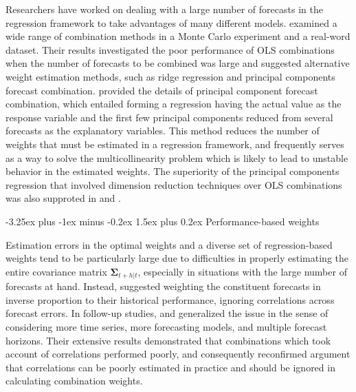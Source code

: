 \documentclass[11pt]{article}
\makeatletter
\renewcommand{\paragraph}{\@startsection{paragraph}{4}{0ex}%
   {-3.25ex plus -1ex minus -0.2ex}%
   {1.5ex plus 0.2ex}%
   {\normalfont\normalsize\bfseries}}
\makeatother
\begin{document}
Researchers have worked on dealing with a large number of forecasts in the regression framework to take advantages of many different models. \cite{Chan1999-io} examined a wide range of combination methods in a Monte Carlo experiment and a real-word dataset. Their results investigated the poor performance of OLS combinations when the number of forecasts to be combined was large and suggested alternative weight estimation methods, such as ridge regression and principal components forecast combination. \cite{Stock2004-rq} provided the details of principal component forecast combination, which entailed forming a regression having the actual value as the response variable and the first few principal components reduced from several forecasts as the explanatory variables. This method reduces the number of weights that must be estimated in a regression framework, and frequently serves as a way to solve the multicollinearity problem which is likely to lead to unstable behavior in the estimated weights. The superiority of the principal components regression that involved dimension reduction techniques over OLS combinations was also supproted in \cite{Rapach2008-jh} and \cite{Poncela2011-vz}.

\paragraph{Performance-based weights}

Estimation errors in the optimal weights and a diverse set of regression-based weights tend to be particularly large due to difficulties in properly estimating the entire covariance matrix $\boldsymbol{\Sigma}_{t+h|t}$, especially in situations with the large number of forecasts at hand. Instead, \cite{Bates1969-yj} suggested weighting the constituent forecasts in inverse proportion to their historical performance, ignoring correlations across forecast errors. In follow-up studies, \cite{Newbold1974-lp} and \cite{Winkler1983-ra} generalized the issue in the sense of considering more time series, more forecasting models, and multiple forecast horizons. Their extensive results demonstrated that combinations which took account of correlations performed poorly, and consequently reconfirmed \cite{Bates1969-yj} argument that correlations can be poorly estimated in practice and should be ignored in calculating combination weights.
\end{document}
